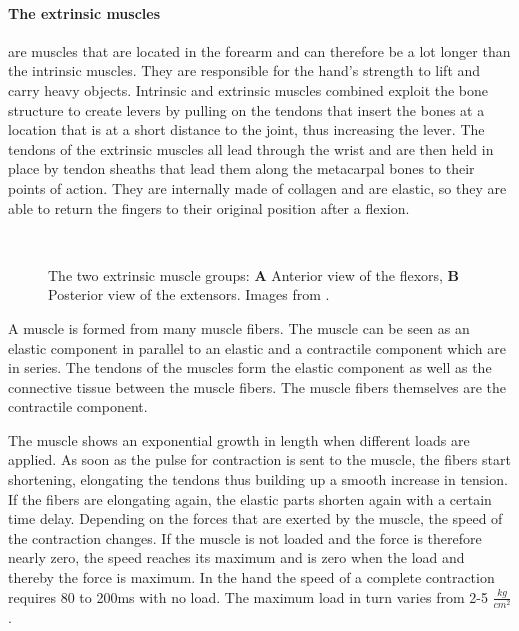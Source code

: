 \documentclass[main]{subfiles}
\begin{document}
\paragraph{The extrinsic muscles} are muscles that are located in the forearm and can therefore be a lot longer than the intrinsic muscles. They are responsible for the hand's strength to lift and carry heavy objects. Intrinsic and extrinsic muscles combined exploit the bone structure to create levers by pulling on the tendons that insert the bones at a location that is at a short distance to the joint, thus increasing the lever. The tendons of the extrinsic muscles all lead through the wrist and are then held in place by tendon sheaths that lead them along the metacarpal bones to their points of action. They are internally made of collagen and are elastic, so they are able to return the fingers to their original position after a flexion.

\begin{figure}[H]
\centering
{}\hspace{0.15\textwidth}
\\

\caption[The two extrinsic muscle groups of the human hand]{The two extrinsic muscle groups: \textbf{A} Anterior view of the flexors, \textbf{B} Posterior view of the extensors. Images from \cite{Reynolds2004}.}
\label{fig:extrinsic-muscles}
\end{figure}

A muscle is formed from many muscle fibers. The muscle can be seen as an elastic component in parallel to an elastic and a contractile component which are in series. The tendons of the muscles form the elastic component as well as the connective tissue between the muscle fibers. The muscle fibers themselves are the contractile component.

The muscle shows an exponential growth in length when different loads are applied. As soon as the pulse for contraction is sent to the muscle, the fibers start shortening, elongating the tendons thus building up a smooth increase in tension. If the fibers are elongating again, the elastic parts shorten again with a certain time delay. Depending on the forces that are exerted by the muscle, the speed of the contraction changes. If the muscle is not loaded and the force is therefore nearly zero, the speed reaches its maximum and is zero when the load and thereby the force is maximum. In the hand the speed of a complete contraction requires 80 to 200ms with no load. The maximum load in turn varies from 2-5 $\frac{kg}{cm^2}$.
\end{document}
